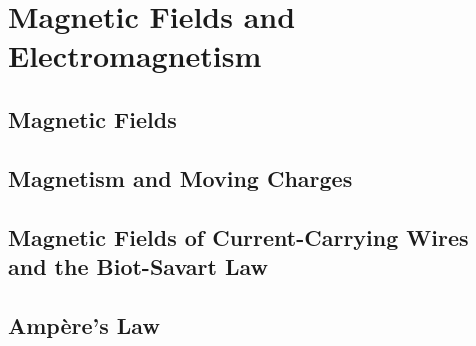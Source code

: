 \documentclass[../em.tex]{subfiles}
\begin{document}
\chapter{Magnetic Fields and Electromagnetism}
\section{Magnetic Fields}
\section{Magnetism and Moving Charges}
\section{Magnetic Fields of Current-Carrying Wires and the Biot-Savart Law}
\section{Ampère's Law}
\end{document}
